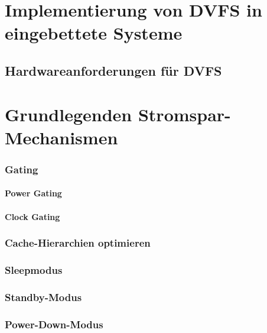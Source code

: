 \documentclass[footmark=none]{tubaf-thesis}
\begin{document}
        
        
	\chapter{Implementierung von DVFS in eingebettete Systeme}
       
       	\section{Hardwareanforderungen für DVFS}
       	
       	
       	
	\chapter{Grundlegenden Stromspar-Mechanismen}
	
		\subsection{Gating}
			
			\subsubsection{Power Gating}
		
			\subsubsection{Clock Gating}
		
		\subsection{Cache-Hierarchien optimieren}
		
		\subsection{Sleepmodus}
		
		\subsection{Standby-Modus}
		
		\subsection{Power-Down-Modus}
       
       		
       	
       	
       	
\end{document}

